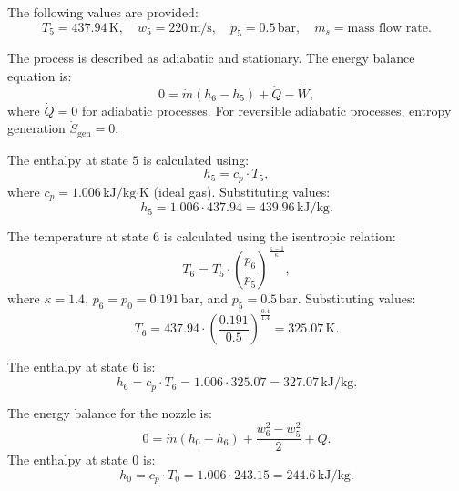 The following values are provided:  
\[
T_5 = 437.94 \, \text{K}, \quad w_5 = 220 \, \text{m/s}, \quad p_5 = 0.5 \, \text{bar}, \quad m_s = \text{mass flow rate}.
\]

The process is described as adiabatic and stationary. The energy balance equation is:  
\[
0 = \dot{m} \left( h_6 - h_5 \right) + \dot{Q} - \dot{W},
\]  
where \( \dot{Q} = 0 \) for adiabatic processes. For reversible adiabatic processes, entropy generation \( \dot{S}_{\text{gen}} = 0 \).

The enthalpy at state \( 5 \) is calculated using:  
\[
h_5 = c_p \cdot T_5,
\]  
where \( c_p = 1.006 \, \text{kJ/kg·K} \) (ideal gas). Substituting values:  
\[
h_5 = 1.006 \cdot 437.94 = 439.96 \, \text{kJ/kg}.
\]

The temperature at state \( 6 \) is calculated using the isentropic relation:  
\[
T_6 = T_5 \cdot \left( \frac{p_6}{p_5} \right)^{\frac{\kappa - 1}{\kappa}},
\]  
where \( \kappa = 1.4 \), \( p_6 = p_0 = 0.191 \, \text{bar} \), and \( p_5 = 0.5 \, \text{bar}. \) Substituting values:  
\[
T_6 = 437.94 \cdot \left( \frac{0.191}{0.5} \right)^{\frac{0.4}{1.4}} = 325.07 \, \text{K}.
\]

The enthalpy at state \( 6 \) is:  
\[
h_6 = c_p \cdot T_6 = 1.006 \cdot 325.07 = 327.07 \, \text{kJ/kg}.
\]

The energy balance for the nozzle is:  
\[
0 = \dot{m} \left( h_0 - h_6 \right) + \frac{w_6^2 - w_5^2}{2} + Q.
\]  
The enthalpy at state \( 0 \) is:  
\[
h_0 = c_p \cdot T_0 = 1.006 \cdot 243.15 = 244.6 \, \text{kJ/kg}.
\]